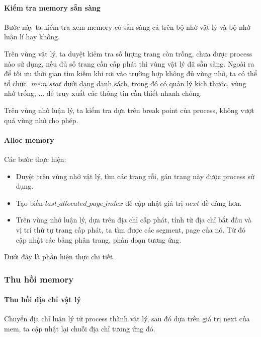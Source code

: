 \paragraph{Kiểm tra memory sẵn sàng}

Bước này ta kiểm tra xem memory có sẵn sàng cả trên bộ nhớ vật lý và bộ nhớ luận lí hay không.

Trên vùng vật lý, ta duyệt kiẻm tra số lượng trang còn trống, chưa được process nào sử dụng, nếu đủ số trang cần cấp phát thì vùng vật lý đã sẵn sàng. Ngoài ra để tối ưu thời gian tìm kiếm khi rơi vào trường hợp không đủ vùng nhớ, ta có thể tổ chức $ \_mem\_stat $ dưới dạng danh sách, trong đó có quản lý kích thước, vùng nhớ trống, ... để truy xuất các thông tin cần thiết nhanh chóng.

Trên vùng nhớ luận lý, ta kiểm tra dựa trên break point của process, không vượt quá vùng nhớ cho phép.



\paragraph{Alloc memory}

Các bước thực hiện:

\begin{itemize}
	\item Duyệt trên vùng nhớ vật lý, tìm các trang rỗi, gán trang này được process sử dụng.
	\item Tạo biến $ last\_allocated\_page\_index $ để cập nhật giá trị $ next $ dễ dàng hơn.
	\item Trên vùng nhớ luận lý, dựa trên địa chỉ cấp phát, tính từ địa chỉ bắt đầu và vị trí thứ tự trang cấp phát, ta tìm được các segment, page của nó. Từ đó cập nhật các bảng phân trang, phân đoạn tương ứng.
\end{itemize}


Dưới đây là phần hiện thực chi tiết.






\subsubsection{Thu hồi memory}


\paragraph{Thu hồi địa chỉ vật lý}
Chuyển địa chỉ luận lý từ process thành  vật lý, sau đó dựa trên giá trị next của mem, ta cập nhật lại chuỗi địa chỉ tương ứng đó. 


